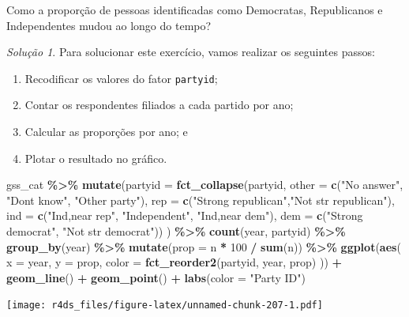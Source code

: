 \documentclass[
]{latex/krantz}
\newenvironment{Shaded}{\begin{snugshade}}{\end{snugshade}}
\newcommand{\AttributeTok}[1]{\textcolor[rgb]{0.13,0.29,0.53}{#1}}
\newcommand{\DecValTok}[1]{\textcolor[rgb]{0.00,0.00,0.81}{#1}}
\newcommand{\FunctionTok}[1]{\textcolor[rgb]{0.13,0.29,0.53}{\textbf{#1}}}
\newcommand{\NormalTok}[1]{#1}
\newcommand{\SpecialCharTok}[1]{\textcolor[rgb]{0.81,0.36,0.00}{\textbf{#1}}}
\newcommand{\StringTok}[1]{\textcolor[rgb]{0.31,0.60,0.02}{#1}}
\providecommand{\tightlist}{%
  \setlength{\itemsep}{0pt}\setlength{\parskip}{0pt}}
\theoremstyle{definition}
\theoremstyle{definition}
\theoremstyle{definition}
\theoremstyle{definition}
\theoremstyle{remark}
\newtheorem*{solution}{Solução}
\begin{document}
Como a proporção de pessoas identificadas como Democratas, Republicanos e Independentes mudou ao longo do tempo?

\begin{solution}
Para solucionar este exercício, vamos realizar os seguintes passos:

\begin{enumerate}
\def\labelenumi{\arabic{enumi}.}
\tightlist
\item
  Recodificar os valores do fator \texttt{partyid};
\item
  Contar os respondentes filiados a cada partido por ano;
\item
  Calcular as proporções por ano; e
\item
  Plotar o resultado no gráfico.
\end{enumerate}

\begin{Shaded}
\begin{Highlighting}[]
\NormalTok{gss\_cat }\SpecialCharTok{\%\textgreater{}\%}
  \FunctionTok{mutate}\NormalTok{(}\AttributeTok{partyid =} \FunctionTok{fct\_collapse}\NormalTok{(partyid, }
                                \AttributeTok{other =} \FunctionTok{c}\NormalTok{(}\StringTok{"No answer"}\NormalTok{, }\StringTok{"Don\textquotesingle{}t know"}\NormalTok{, }\StringTok{"Other party"}\NormalTok{),}
                                \AttributeTok{rep =} \FunctionTok{c}\NormalTok{(}\StringTok{"Strong republican"}\NormalTok{,}\StringTok{"Not str republican"}\NormalTok{),}
                                \AttributeTok{ind =} \FunctionTok{c}\NormalTok{(}\StringTok{"Ind,near rep"}\NormalTok{, }\StringTok{"Independent"}\NormalTok{, }\StringTok{"Ind,near dem"}\NormalTok{),}
                                \AttributeTok{dem =} \FunctionTok{c}\NormalTok{(}\StringTok{"Strong democrat"}\NormalTok{, }\StringTok{"Not str democrat"}\NormalTok{))}
\NormalTok{         ) }\SpecialCharTok{\%\textgreater{}\%}
  \FunctionTok{count}\NormalTok{(year, partyid) }\SpecialCharTok{\%\textgreater{}\%}
  \FunctionTok{group\_by}\NormalTok{(year) }\SpecialCharTok{\%\textgreater{}\%}
  \FunctionTok{mutate}\NormalTok{(}\AttributeTok{prop =}\NormalTok{ n }\SpecialCharTok{*} \DecValTok{100} \SpecialCharTok{/} \FunctionTok{sum}\NormalTok{(n)) }\SpecialCharTok{\%\textgreater{}\%}
  \FunctionTok{ggplot}\NormalTok{(}\FunctionTok{aes}\NormalTok{(}
    \AttributeTok{x =}\NormalTok{ year, }
    \AttributeTok{y =}\NormalTok{ prop, }
    \AttributeTok{color =} \FunctionTok{fct\_reorder2}\NormalTok{(partyid, year, prop)}
\NormalTok{  )) }\SpecialCharTok{+}
    \FunctionTok{geom\_line}\NormalTok{() }\SpecialCharTok{+}
    \FunctionTok{geom\_point}\NormalTok{() }\SpecialCharTok{+}
    \FunctionTok{labs}\NormalTok{(}\AttributeTok{color =} \StringTok{"Party ID"}\NormalTok{)}
\end{Highlighting}
\end{Shaded}

\texttt{[image: r4ds\_files/figure-latex/unnamed-chunk-207-1.pdf]}
\end{solution}
\end{document}
